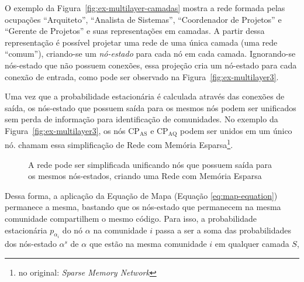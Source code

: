\documentclass[12pt,a4paper]{article}
\begin{document}
O exemplo da Figura~\ref{fig:ex-multilayer-camadas} mostra a rede formada pelas ocupações \enquote{Arquiteto}, \enquote{Analista de Sistemas}, \enquote{Coordenador de Projetos} e \enquote{Gerente de Projetos} e suas representações em camadas. A partir dessa representação é possível projetar uma rede de uma única camada (uma rede \enquote{comum}), criando-se um \textit{nó-estado} para cada nó em cada camada. Ignorando-se nós-estado que não possuem conexões, essa projeção cria um nó-estado para cada conexão de entrada, como pode ser observado na Figura~\ref{fig:ex-multilayer3}.

Uma vez que a probabilidade estacionária é calculada através das conexões de saída, os nós-estado que possuem saída para os mesmos nós podem ser unificados sem perda de informação para identificação de comunidades. No exemplo da Figura~\ref{fig:ex-multilayer3}, os nós $\text{CP}_\text{AS}$ e $\text{CP}_\text{AQ}$ podem ser unidos em um único nó.  chamam essa simplificação de Rede com Memória Esparsa\footnote{no original: \textit{Sparse Memory Network}}.

\begin{figure}[htb]
    \centering
    \caption{A rede pode ser simplificada unificando nós que possuem saída para os mesmos nós-estados, criando uma Rede com Memória Esparsa~\cite{Edler2017-kt}}
    \label{fig:ex-multilayer-memoria}
\end{figure}

Dessa forma, a aplicação da Equação de Mapa (Equação \ref{eq:map-equation}) permanece a mesma, bastando que os nós-estado que permanecem na mesma comunidade compartilhem o mesmo código. Para isso, a probabilidade estacionária $p_{\alpha_i}$ do nó $\alpha$ na comunidade $i$ passa a ser a soma das probabilidades dos nós-estado $\alpha^s$ de $\alpha$ que estão na mesma comunidade $i$ em qualquer camada $S$,
\end{document}
